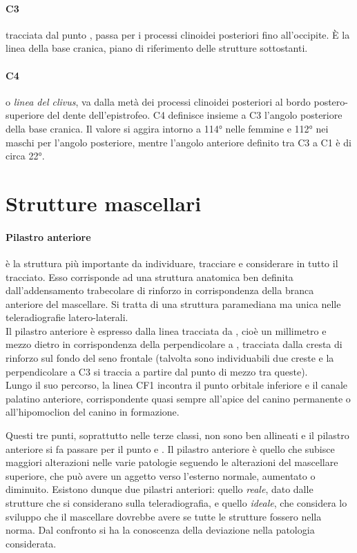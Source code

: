 \paragraph{C3} tracciata dal punto , passa per i processi clinoidei posteriori fino all'occipite. È la linea della base cranica, piano di riferimento delle strutture sottostanti.

\paragraph{C4} o \emph{linea del clivus}, va dalla metà dei processi clinoidei posteriori al bordo postero-superiore del dente dell'epistrofeo. C4 definisce insieme a C3 l'angolo posteriore della base cranica. Il valore si aggira intorno a 114° nelle femmine e 112° nei maschi per l'angolo posteriore, mentre l'angolo anteriore definito tra C3 a C1 è di circa 22°.

\section{Strutture mascellari}
\paragraph{Pilastro anteriore} è la struttura più importante da individuare, tracciare e considerare in tutto il tracciato. Esso corrisponde ad una struttura anatomica ben definita dall'addensamento trabecolare di rinforzo in corrispondenza della branca anteriore del mascellare. Si tratta di una struttura paramediana ma unica nelle teleradiografie latero-laterali.\\

Il pilastro anteriore è espresso dalla linea  tracciata da , cioè un millimetro e mezzo dietro  in corrispondenza della perpendicolare a , tracciata dalla cresta di rinforzo sul fondo del seno frontale (talvolta sono individuabili due creste e la perpendicolare a C3 si traccia a partire dal punto di mezzo tra queste).\\

Lungo il suo percorso, la linea CF1 incontra il punto orbitale inferiore e il canale palatino anteriore, corrispondente quasi sempre all'apice del canino permanente o all'hipomoclion del canino in formazione.

Questi tre punti, soprattutto nelle terze classi, non sono ben allineati e il pilastro anteriore si fa passare per il punto  e . Il pilastro anteriore è quello che subisce maggiori alterazioni nelle varie patologie seguendo le alterazioni del mascellare superiore, che può avere un aggetto verso l'esterno normale, aumentato o diminuito. Esistono dunque due pilastri anteriori: quello \emph{reale}, dato dalle strutture che si considerano sulla teleradiografia, e quello \emph{ideale}, che considera lo sviluppo che il mascellare dovrebbe avere se tutte le strutture fossero nella norma. Dal confronto si ha la conoscenza della deviazione nella patologia considerata.\\

